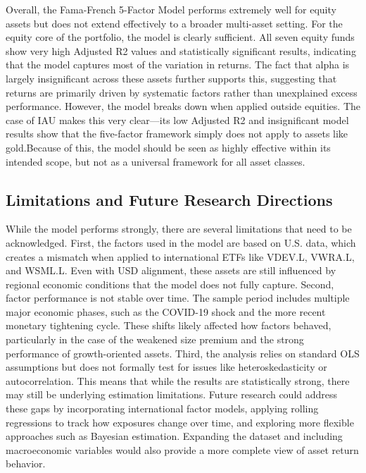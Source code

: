 \documentclass[12pt]{article}
\begin{document}
Overall, the Fama-French 5-Factor Model performs extremely well for equity assets but does not extend effectively to a broader multi-asset setting. For the equity core of the portfolio, the model is clearly sufficient. All seven equity funds show very high Adjusted R2 values and statistically significant results, indicating that the model captures most of the variation in returns. The fact that alpha is largely insignificant across these assets further supports this, suggesting that returns are primarily driven by systematic factors rather than unexplained excess performance.
However, the model breaks down when applied outside equities. The case of IAU makes this very clear—its low Adjusted R2 and insignificant model results show that the five-factor framework simply does not apply to assets like gold.Because of this, the model should be seen as highly effective within its intended scope, but not as a universal framework for all asset classes.

\subsection{Limitations and Future Research Directions}

While the model performs strongly, there are several limitations that need to be acknowledged.
First, the factors used in the model are based on U.S. data, which creates a mismatch when applied to international ETFs like VDEV.L, VWRA.L, and WSML.L. Even with USD alignment, these assets are still influenced by regional economic conditions that the model does not fully capture.
Second, factor performance is not stable over time. The sample period includes multiple major economic phases, such as the COVID-19 shock and the more recent monetary tightening cycle. These shifts likely affected how factors behaved, particularly in the case of the weakened size premium and the strong performance of growth-oriented assets.
Third, the analysis relies on standard OLS assumptions but does not formally test for issues like heteroskedasticity or autocorrelation. This means that while the results are statistically strong, there may still be underlying estimation limitations.
Future research could address these gaps by incorporating international factor models, applying rolling regressions to track how exposures change over time, and exploring more flexible approaches such as Bayesian estimation. Expanding the dataset and including macroeconomic variables would also provide a more complete view of asset return behavior.
\end{document}
